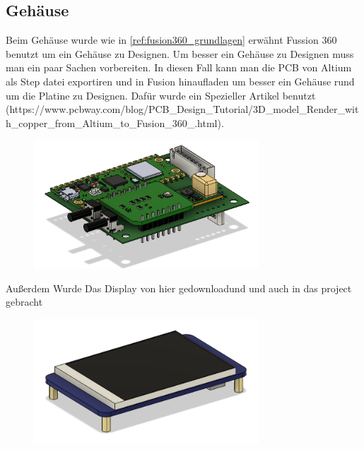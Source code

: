 \begin{inhalt}
\renewcommand*\chapterpagestyle{scrheadings}
\chapter{Gehäuse}

Beim Gehäuse wurde wie in \ref{ref:fusion360_grundlagen} erwähnt Fussion 360 benutzt um ein Gehäuse zu Designen. Um besser ein Gehäuse zu Designen muss man ein paar Sachen vorbereiten. In diesen Fall kann man die PCB von Altium als Step datei exportiren und in Fusion hinaufladen um besser ein Gehäuse rund um die Platine zu Designen. Dafür wurde ein Spezieller Artikel benutzt (https://www.pcbway.com/blog/PCB_Design_Tutorial/3D_model_Render_with_copper_from_Altium_to_Fusion_360_.html). 

\begin{figure}[!htb]
\centering
\includegraphics[width=0.75\textwidth]{files/Thomas/pics/geheause/pcb_fusion.png}
\caption[Bildbezeichnung für Abbildungsverzeichnis]{}
\label{fig:gehaeuse_internet_bild}
\end{figure}

Außerdem Wurde Das Display von hier gedownloadund und auch in das project gebracht

\begin{figure}[!htb]
\centering
\includegraphics[width=0.75\textwidth]{files/Thomas/pics/geheause/display_fusion.png}
\caption[Bildbezeichnung für Abbildungsverzeichnis]{}
\label{fig:gehaeuse_internet_bild}
\end{figure}


\end{inhalt}
